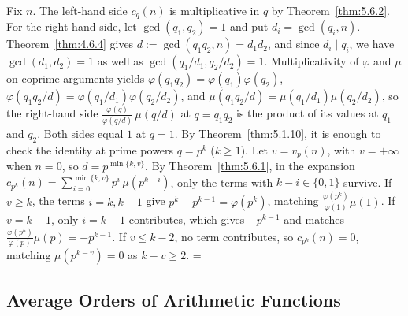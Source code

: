 \documentclass[11pt]{article}
\makeatletter
\theoremstyle{ntstyle}
\let\nt@closedisplay\]
\def\nt@guardedclose{\@ifnextchar\par{\nt@closeafterpar}{\@ifnextchar\end{\postdisplaypenalty\@M\nt@closedisplay}{\nt@closedisplay}}}
\def\nt@closeafterpar\par{\@ifnextchar\par{\nt@closeafterpar}{\@ifnextchar\end{\postdisplaypenalty\@M\nt@closedisplay\par}{\nt@closedisplay\par}}}
\renewenvironment{proof}[1][\proofname]{\par
  \pushQED{\qed}\normalfont\topsep\medskipamount\edef\nt@afterproof{\@endparpenalty=\the\@endparpenalty\relax}\@beginparpenalty\@M\@endparpenalty\@M\let\]\nt@guardedclose\trivlist\item[]\textit{#1\@addpunct{.}} \ignorespaces}{\ifvmode\addpenalty\@M\fi\popQED\nt@afterproof\endtrivlist\@endpefalse}
\makeatother
\begin{document}
\begin{proof} Fix $n$.
The left-hand side $c_q(n)$ is multiplicative in $q$ by Theorem~\ref{thm:5.6.2}.
For the right-hand side, let $\gcd(q_1, q_2) = 1$ and put $d_i = \gcd(q_i, n)$.
Theorem~\ref{thm:4.6.4} gives $d := \gcd(q_1 q_2, n) = d_1 d_2$, and since $d_i \mid q_i$, we have
$\gcd(d_1, d_2) = 1$ as well as $\gcd(q_1/d_1, q_2/d_2) = 1$.
Multiplicativity of $\varphi$ and $\mu$ on coprime arguments yields $\varphi(q_1 q_2) =
\varphi(q_1)\varphi(q_2)$, $\varphi(q_1 q_2/d) = \varphi(q_1/d_1)\varphi(q_2/d_2)$, and $\mu(q_1
q_2/d) = \mu(q_1/d_1)\mu(q_2/d_2)$,
so the right-hand side $\tfrac{\varphi(q)}{\varphi(q/d)}\,\mu(q/d)$ at $q = q_1 q_2$ is the product
of its values at $q_1$ and $q_2$.
Both sides equal
	$1$ at $q = 1$. By Theorem~\ref{thm:5.1.10}, it is enough to
	check the identity at prime powers $q = p^{k}$ ($k \ge 1$). Let $v=v_p(n)$, with $v=+\infty$ when $n=0$, so
	$d=p^{\min\{k,v\}}$. By Theorem~\ref{thm:5.6.1}, in the expansion $c_{p^{k}}(n) = \sum_{i=0}^{\min\{k, v\}}
	p^{i}\, \mu(p^{k-i})$, only the terms with $k - i \in \{0,1\}$ survive. If $v \ge k$,
	the terms $i = k, k-1$ give $p^{k} - p^{k-1} = \varphi(p^{k})$,
	matching $\tfrac{\varphi(p^{k})}{\varphi(1)}\mu(1)$. If $v = k-1$,
	only $i = k-1$ contributes, which gives $-p^{k-1}$ and matches
	$\tfrac{\varphi(p^{k})}{\varphi(p)}\mu(p) = -p^{k-1}$. If $v \le k-2$,
	no term contributes, so $c_{p^{k}}(n) = 0$, matching $\mu(p^{k-v}) = 0$
	as $k - v \ge 2$.
\end{proof}
\subsection{Average Orders of Arithmetic Functions}
\end{document}
